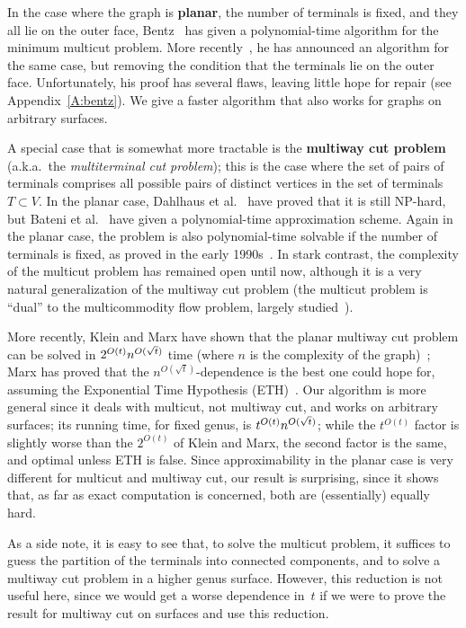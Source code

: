 \documentclass[11pt]{article}
\theoremstyle{plain}  \newtheorem{theorem}{Theorem}[section]
\theoremstyle{definition}
\begin{document}
\smallskip

In the case where the graph is \textbf{planar}, the number of terminals is
fixed, and they all lie on the outer face, Bentz~\cite{b-sampg-09} has
given a polynomial-time algorithm for the minimum multicut problem.  More
recently~\cite{b-ptapm-12}, he has announced an algorithm for the same
case, but removing the condition that the terminals lie on the outer face.
Unfortunately, his proof has several flaws, leaving little hope for repair
(see Appendix~\ref{A:bentz}).  We give a faster algorithm that also works
for graphs on arbitrary surfaces.

\smallskip

A special case that is somewhat more tractable is the \textbf{multiway cut
  problem} (a.k.a.\ the \emph{multiterminal cut problem}); this is the case
where the set of pairs of terminals comprises all possible pairs of
distinct vertices in the set of terminals $T\subset V$.  In the planar
case, Dahlhaus et al.~\cite{djpsy-cmc-94} have proved that it is still
NP-hard, but Bateni et al.~\cite{bhkm-ptasp-12} have given a
polynomial-time approximation scheme.  Again in the planar case, the
problem is also polynomial-time solvable if the number of terminals is
fixed, as proved in the early 1990s~\cite{djpsy-cmc-94,h-pmcp-98}.  In
stark contrast, the complexity of the multicut problem has remained open
until now, although it is a very natural generalization of the multiway cut
problem (the multicut problem is ``dual'' to the multicommodity flow
problem, largely studied~\cite[Chapters 70--76]{s-cope-03}).

More recently, Klein and Marx have shown that the planar multiway cut
problem can be solved in $2^{O(t)}\*n^{O(\sqrt{t})}$ time (where $n$ is the
complexity of the graph)~\cite{km-spktc-12}; Marx has proved that the
$n^{O(\sqrt{t})}$-dependence is the best one could hope for, assuming the
Exponential Time Hypothesis (ETH)~\cite{m-tlbpm-12}.  Our algorithm is more
general since it deals with multicut, not multiway cut, and works on
arbitrary surfaces; its running time, for fixed genus, is
$t^{O(t)}\*n^{O(\sqrt{t})}$; while the $t^{O(t)}$ factor is slightly worse
than the $2^{O(t)}$ of Klein and Marx, the second factor is the same, and
optimal unless ETH is false.  Since approximability in the planar case is
very different for multicut and multiway cut, our result is surprising,
since it shows that, as far as exact computation is concerned, both are
(essentially) equally hard.

As a side note, it is easy to see that, to solve the multicut problem, it
suffices to guess the partition of the terminals into connected components,
and to solve a multiway cut problem in a higher genus surface.  However,
this reduction is not useful here, since we would get a worse dependence
in~$t$ if we were to prove the result for multiway cut on surfaces and use
this reduction.
\end{document}
